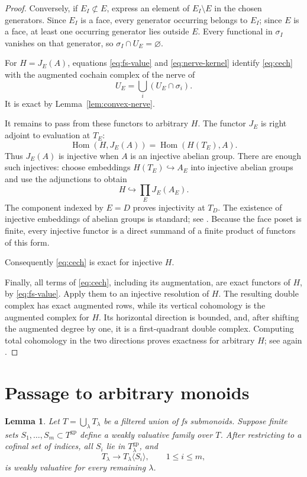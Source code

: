 \documentclass[11pt]{article}
\newtheorem{lemma}[theorem]{Lemma}
\theoremstyle{definition}
\theoremstyle{remark}
\DeclareMathOperator{\Hom}{Hom}
\newcommand{\gp}{\mathrm{gp}}
\begin{document}
\begin{proof}
Conversely, if \(E_I\not\subset E\), express an element of
\(E_I\setminus E\) in the chosen generators. Since \(E_I\) is a
face, every generator occurring belongs to \(E_I\); since \(E\)
is a face, at least one occurring generator lies outside \(E\).
Every functional in \(\sigma_I\) vanishes on that generator, so
\(\sigma_I\cap U_E=\varnothing\).

For \(H=J_E(A)\), equations \eqref{eq:fs-value} and
\eqref{eq:nerve-kernel} identify \eqref{eq:cech} with the augmented
cochain complex of the nerve of
\[
U_E=\bigcup_i(U_E\cap\sigma_i).
\]
It is exact by Lemma~\ref{lem:convex-nerve}.

It remains to pass from these functors to arbitrary \(H\).
The functor \(J_E\) is right adjoint to evaluation at \(T_E\):
\[
\Hom(H,J_E(A))=\Hom(H(T_E),A).
\]
Thus \(J_E(A)\) is injective when \(A\) is an injective abelian
group. There are enough such injectives: choose embeddings
\(H(T_E)\hookrightarrow A_E\) into injective abelian groups and
use the adjunctions to obtain
\[
H\hookrightarrow\prod_E J_E(A_E).
\]
The component indexed by \(E=D\) proves injectivity at \(T_D\).
The existence of injective embeddings of abelian groups is
standard; see \cite[Tag~01D6]{Stacks}.
Because the face poset is finite, every injective functor is a
direct summand of a finite product of functors of this form.

Consequently \eqref{eq:cech} is exact for injective \(H\).

Finally, all terms of \eqref{eq:cech}, including its augmentation,
are exact functors of \(H\), by \eqref{eq:fs-value}. Apply them to
an injective resolution of \(H\). The resulting double complex
has exact augmented rows, while its vertical cohomology is the
augmented complex for \(H\). Its horizontal direction is bounded,
and, after shifting the augmented degree by one, it is a
first-quadrant double complex. Computing total cohomology in the
two directions proves exactness for arbitrary \(H\); see again
\cite[Tag~012X]{Stacks}.
\end{proof}

\section{Passage to arbitrary monoids}

\begin{lemma}\label{lem:weak-descent}
Let \(T=\bigcup_\lambda T_\lambda\) be a filtered union of fs
submonoids. Suppose finite sets \(S_1,\ldots,S_m\subset T^{\gp}\)
define a weakly valuative family over \(T\). After restricting to
a cofinal set of indices, all \(S_i\) lie in \(T_\lambda^{\gp}\),
and
\[
T_\lambda\longrightarrow T_\lambda\langle S_i\rangle,
\qquad 1\le i\le m,
\]
is weakly valuative for every remaining \(\lambda\).
\end{lemma}
\end{document}
